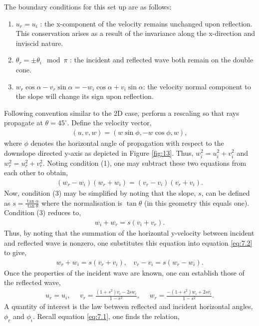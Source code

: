 \documentclass[a4paper]{article}
\numberwithin{equation}{section}
\begin{document}
The boundary conditions for this set up are as follows:
\begin{enumerate}
\item $u_r = u_i$ : the x-component of the velocity remains unchanged upon reflection. This conservation arises as a result of the invariance along the x-direction and inviscid nature.
\item $\theta_r = \pm\theta_i\mod \pi$ : the incident and reflected wave both remain on the double cone.
\item $w_r\cos\alpha - v_r\sin\alpha = - w_i\cos\alpha + v_i\sin\alpha$: the velocity normal component to the slope will change its sign upon reflection.
\end{enumerate}
Following convention similar to the 2D case, perform a rescaling so that rays propagate at $\theta = 45^{\circ}$. Define the velocity vector,
\begin{align}\label{eq:7.1}
(u, v, w) = (w\sin\phi, -w\cos \phi, w),
\end{align}
where $\phi$ denotes the horizontal angle of propagation with respect to the downslope directed y-axis as depicted in Figure \ref{fig:13}. Thus, $w^2_i = u^2_i + v^2_i$ and $w^2_r = u^2_r + v^2_r$. Noting condition (1), one may subtract these two equations from each other to obtain, 
\begin{align}\label{eq:7.2}
(w_r - w_i)(w_r + w_i) = (v_r - v_i)(v_r + v_i).
\end{align}
Now, condition (3) may be simplified by noting that the slope, $s$, can be defined as $s = \frac{\tan \alpha}{\tan\theta}$ where the normalisation is $\tan\theta$ (in this geometry this equals one). Condition (3) reduces to, 
\begin{align*}
w_i + w_r = s(v_i + v_r).
\end{align*}
Thus, by noting that the summation of the horizontal y-velocity between incident and reflected wave is nonzero, one substitutes this equation into equation \eqref{eq:7.2} to give,
\begin{align*}
w_r + w_i = s(v_r + v_i), ~~~~ v_r - v_i = s(w_r - w_i).
\end{align*}
Once the properties of the incident wave are known, one can establish those of the reflected wave,
\begin{align*}
u_r = u_i, ~~~~~~
v_r = \frac{(1+s^2)v_i - 2sw_i}{1- s^2},~~~~~~
w_r = \frac{-(1+s^2)w_i + 2sv_i}{1- s^2}.
\end{align*}
A quantity of interest is the law between reflected and incident horizontal angles, $\phi_r$ and $\phi_i$. Recall equation \eqref{eq:7.1}, one finds the relation, 
\end{document}
